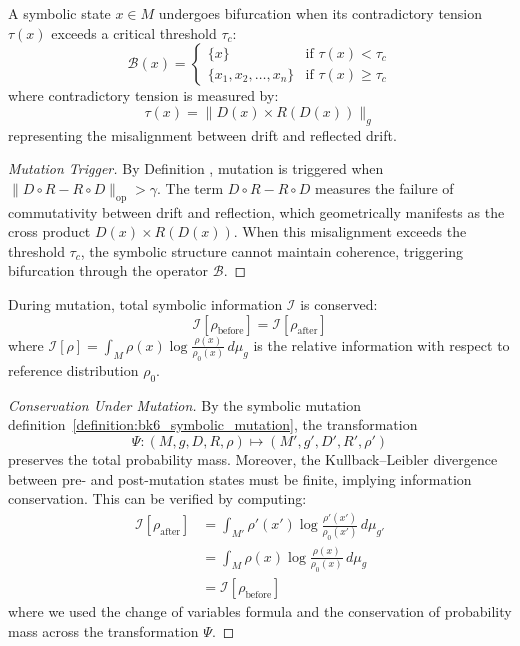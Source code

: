 \begin{proposition}
\label{prop:bk6_bifurcation_threshold}
A symbolic state $x \in M$ undergoes bifurcation when its contradictory tension $\tau(x)$ exceeds a critical threshold $\tau_c$:
\begin{equation}
\mathcal{B}(x) = \begin{cases}
\{x\} & \text{if } \tau(x) < \tau_c \\
\{x_1, x_2, \ldots, x_n\} & \text{if } \tau(x) \geq \tau_c
\end{cases}
\end{equation}
where contradictory tension is measured by:
\begin{equation}
\tau(x) = \|D(x) \times R(D(x))\|_g
\end{equation}
representing the misalignment between drift and reflected drift.
\begin{proof}[Mutation Trigger]
\label{proof:bk6_mutation_trigger}
By Definition , mutation is triggered when $\|D \circ R - R \circ D\|_{\text{op}} > \gamma$. The term $D \circ R - R \circ D$ measures the failure of commutativity between drift and reflection, which geometrically manifests as the cross product $D(x) \times R(D(x))$. When this misalignment exceeds the threshold $\tau_c$, the symbolic structure cannot maintain coherence, triggering bifurcation through the operator $\mathcal{B}$.
\end{proof}
\end{proposition}
\begin{lemma}
\label{lemma:bk6_conservation_of_symbolic_information}
During mutation, total symbolic information $\mathcal{I}$ is conserved:
\begin{equation}
\mathcal{I}[\rho_{\text{before}}] = \mathcal{I}[\rho_{\text{after}}]
\end{equation}
where $\mathcal{I}[\rho] = \int_M \rho(x) \log\frac{\rho(x)}{\rho_0(x)} \, d\mu_g$ is the relative information with respect to reference distribution $\rho_0$.
\begin{proof}[Conservation Under Mutation]
\label{proof:bk6_information_conservation_under_mutation}
By the symbolic mutation definition~\ref{definition:bk6_symbolic_mutation}, the transformation
\[
\Psi: (M, g, D, R, \rho) \mapsto (M', g', D', R', \rho')
\]
preserves the total probability mass.
Moreover, the Kullback–Leibler divergence between pre- and post-mutation states must be finite, 
implying information conservation. This can be verified by computing:
\begin{align}
\mathcal{I}[\rho_{\text{after}}] &= \int_{M'} \rho'(x') \log\frac{\rho'(x')}{\rho_0(x')} \, d\mu_{g'} \\
&= \int_M \rho(x) \log\frac{\rho(x)}{\rho_0(x)} \, d\mu_g \\
&= \mathcal{I}[\rho_{\text{before}}]
\end{align}
where we used the change of variables formula and the conservation of probability mass across the transformation $\Psi$.
\end{proof}
\end{lemma}
